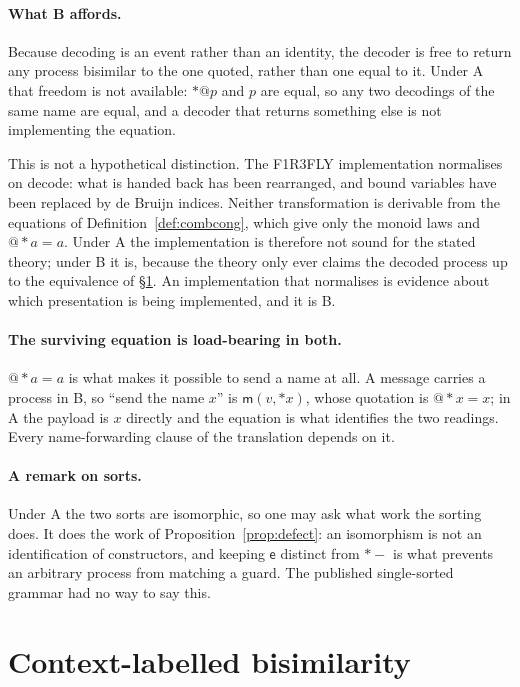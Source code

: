 \documentclass[11pt]{article}
\makeatletter
\theoremstyle{plain}
\theoremstyle{definition}
\theoremstyle{remark}
\newcommand{\quo}[1]{@#1}
\newcommand{\drp}[1]{{*}#1}
\newcommand{\mm}{\mathsf{m}}
\newcommand{\ev}{\mathsf{e}}
\makeatother
\begin{document}
\paragraph{What B affords.} Because decoding is an event rather than an
identity, the decoder is free to return any process bisimilar to the one
quoted, rather than one equal to it. Under A that freedom is not available:
$\drp{\quo{p}}$ and $p$ are equal, so any two decodings of the same name are
equal, and a decoder that returns something else is not implementing the
equation.

This is not a hypothetical distinction. The F1R3FLY implementation normalises
on decode: what is handed back has been rearranged, and bound variables have
been replaced by de Bruijn indices. Neither transformation is derivable from
the equations of Definition~\ref{def:combcong}, which give only the monoid
laws and $\quo{\drp{a}} = a$. Under A the implementation is therefore not
sound for the stated theory; under B it is, because the theory only ever
claims the decoded process up to the equivalence of \S\ref{sec:clb}. An
implementation that normalises is evidence about which presentation is being
implemented, and it is B.

\paragraph{The surviving equation is load-bearing in both.}
$\quo{\drp{a}} = a$ is what makes it possible to send a name at all. A
message carries a process in B, so ``send the name $x$'' is
$\mm(v,\drp{x})$, whose quotation is $\quo{\drp{x}} = x$; in A the payload is
$x$ directly and the equation is what identifies the two readings. Every
name-forwarding clause of the translation depends on it.

\paragraph{A remark on sorts.} Under A the two sorts are isomorphic, so one
may ask what work the sorting does. It does the work of
Proposition~\ref{prop:defect}: an isomorphism is not an identification of
constructors, and keeping $\ev$ distinct from $\drp{-}$ is what prevents an
arbitrary process from matching a guard. The published single-sorted grammar
had no way to say this.

\section{Context-labelled bisimilarity}
\label{sec:clb}
\end{document}

